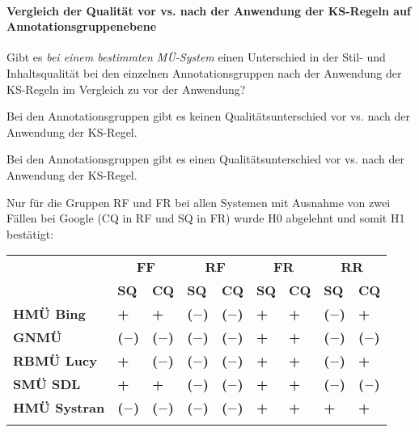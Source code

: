 \paragraph*{Vergleich der Qualität vor vs. nach der Anwendung der KS-Regeln auf Annotationsgruppenebene}
\begin{description}[font=\normalfont\bfseries]
\item [Fragestellung:] Gibt es \textit{bei einem bestimmten MÜ-System} einen Unterschied in der Stil- und Inhaltsqualität bei den einzelnen Annotationsgruppen nach der Anwendung der KS-Regeln im Vergleich zu vor der Anwendung?
\item [H0 --] Bei den Annotationsgruppen gibt es keinen Qualitätsunterschied vor vs. nach der Anwendung der KS-Regel.
\item [H1 --] Bei den Annotationsgruppen gibt es einen Qualitätsunterschied vor vs. nach der Anwendung der KS-Regel.
\item [Resultat:] Nur für die Gruppen RF und FR bei allen Systemen mit Ausnahme von zwei Fällen bei Google (CQ in RF und SQ in FR) wurde H0 abgelehnt und somit H1 bestätigt:
\end{description}
\begin{center}
\begin{tabularx}{.9\textwidth}{lllllllll}
\lsptoprule
\multirow{2}{*}{\diagbox{\textbf{System}}{\textbf{AnnoGr.}}} & \multicolumn{2}{c}{\textbf{FF}} & \multicolumn{2}{c}{\textbf{RF}} & \multicolumn{2}{c}{\textbf{FR}} & \multicolumn{2}{c}{\textbf{RR}}\\
\cmidrule(lr){2-3}\cmidrule(lr){4-5}\cmidrule(lr){6-7}\cmidrule(lr){8-9}
 & \textbf{SQ} & \textbf{CQ} & \textbf{SQ} & \textbf{CQ} & \textbf{SQ} & \textbf{CQ} & \textbf{SQ} & \textbf{CQ}\\
\midrule
\textbf{HMÜ Bing} & \textbf{+} & \textbf{+} & \cellcolor{smGreen}\textbf{($-$)} & \cellcolor{smGreen}\textbf{($-$)} & \cellcolor{smGreen}\textbf{+} & \cellcolor{smGreen}\textbf{+} & \textbf{($-$)} & \textbf{+}\\
\textbf{GNMÜ} & \textbf{($-$)} & \textbf{($-$)} & \cellcolor{smGreen}\textbf{($-$)} & \textbf{($-$)} & \textbf{+} & \cellcolor{smGreen}\textbf{+} & \textbf{($-$)} & \textbf{($-$)}\\
\textbf{RBMÜ Lucy} & \textbf{+} & \textbf{($-$)} & \cellcolor{smGreen}\textbf{($-$)} & \cellcolor{smGreen}\textbf{($-$)} & \cellcolor{smGreen}\textbf{+} & \cellcolor{smGreen}\textbf{+} & \textbf{($-$)} & \textbf{+}\\
\textbf{SMÜ SDL} & \textbf{+} & \textbf{+} & \cellcolor{smGreen}\textbf{($-$)} & \cellcolor{smGreen}\textbf{($-$)} & \cellcolor{smGreen}\textbf{+} & \cellcolor{smGreen}\textbf{+} & \textbf{($-$)} & \textbf{($-$)}\\
\textbf{HMÜ Systran} & \textbf{($-$)} & \textbf{($-$)} & \cellcolor{smGreen}\textbf{($-$)} & \cellcolor{smGreen}\textbf{($-$)} & \cellcolor{smGreen}\textbf{+} & \cellcolor{smGreen}\textbf{+} & \textbf{+} & \textbf{+}\\
\lspbottomrule
\end{tabularx}
\end{center}

